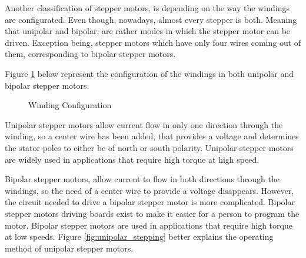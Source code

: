Another classification of stepper motors, is depending on the way the windings are configurated. Even though, nowadays, almost every stepper is both. Meaning that unipolar and bipolar, are rather modes in which the stepper motor can be driven. Exception being, stepper motors which have only four wires coming out of them, corresponding to bipolar stepper motors.

Figure \ref{fig:windings} below represent the configuration of the windings in both unipolar and bipolar stepper motors. 


\begin{figure}[htp] 
    \centering
    \hfill
    \caption{Winding Configuration}
    \label{fig:windings}
\end{figure}

Unipolar stepper motors allow current flow in only one direction through the winding, so a center wire has been added, that provides a voltage and determines the stator poles to either be of north or south polarity. Unipolar stepper motors are widely used in applications that require high torque at high speed.

Bipolar stepper motors, allow current to flow in both directions through the windings, so the need of a center wire to provide a voltage disappears. However, the circuit needed to drive a bipolar stepper motor is more complicated. Bipolar stepper motors driving boards exist to make it easier for a person to program the motor. Bipolar stepper motors are used in applications that require high torque at low speeds.
\newpage
Figure \ref{fig:unipolar_stepping} better explains the operating method of unipolar stepper motors. 

